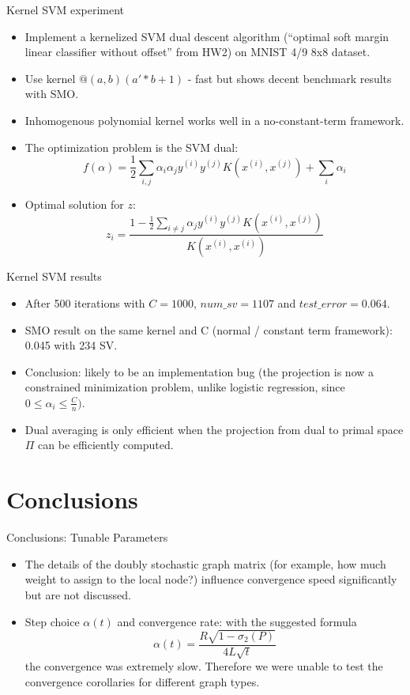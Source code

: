 \documentclass{beamer}
\begin{document}
	\begin{frame}{Kernel SVM experiment}
		\begin{itemize}
			\item Implement a kernelized SVM dual descent algorithm (``optimal soft margin linear classifier without offset'' 
			from HW2) on MNIST 4/9 8x8 dataset.
			\item Use kernel $@(a,b)(a' * b + 1)$ - fast but shows decent benchmark results with SMO.
			\item Inhomogenous polynomial kernel works well in a no-constant-term framework.
			\item The optimization problem is the SVM dual:\[f(\alpha) = \frac{1}{2}\sum_{i,j}\alpha_i\alpha_jy^{(i)}y^{(j)}K(x^{(i)}, x^{(j)}) + \sum_i\alpha_i\]
			\item Optimal solution for $z$:\[z_i = \frac{1 - \frac{1}{2}\sum_{i \not = j}\alpha_jy^{(i)}y^{(j)}K(x^{(i)}, x^{(j)})}{K(x^{(i)}, x^{(i)})}\]
		\end{itemize}
	\end{frame}
				
	\begin{frame}{Kernel SVM results}
		\begin{itemize}
			\item After 500 iterations with $C = 1000$, $num\_sv = 1107$ and $test\_error = 0.064$.
			\item SMO result on the same kernel and C (normal / constant term framework): 0.045 with 234 SV.
			\item Conclusion: likely to be an implementation bug (the projection is now a constrained
				minimization problem, unlike logistic regression, since $0 \leq \alpha_i \leq \frac{C}{n})$.
			\item Dual averaging is only efficient when the projection from dual to primal space $ \Pi$ can
				be efficiently computed.
		\end{itemize}
	\end{frame}
	
	\section{Conclusions}
	\begin{frame}{Conclusions: Tunable Parameters}
		\begin{itemize}
			\item	The details of the doubly stochastic graph matrix (for example, how much weight to 
			assign to the local node?) influence convergence speed significantly but are not discussed.
			\item Step choice $\alpha(t)$ and convergence rate: with the suggested formula
			\[\alpha(t) = \frac{R\sqrt{1-\sigma_2(P)}}{4L\sqrt{t}}\]
			the convergence was extremely slow. Therefore we were unable to test the convergence
			corollaries for different graph types.
		\end{itemize}			
	\end{frame}
	
\end{document}
